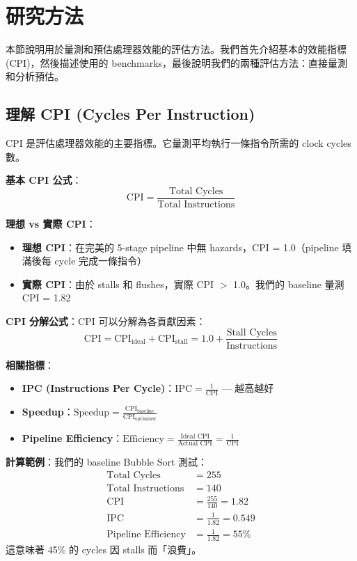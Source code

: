 \documentclass[journal]{IEEEtran}
\begin{document}
\section{研究方法}

本節說明用於量測和預估處理器效能的評估方法。我們首先介紹基本的效能指標 (CPI)，然後描述使用的 benchmarks，最後說明我們的兩種評估方法：直接量測和分析預估。

\subsection{理解 CPI (Cycles Per Instruction)}
CPI 是評估處理器效能的主要指標。它量測平均執行一條指令所需的 clock cycles 數。

\textbf{基本 CPI 公式}：
\begin{equation}
\text{CPI} = \frac{\text{Total Cycles}}{\text{Total Instructions}}
\label{eq:cpi}
\end{equation}

\textbf{理想 vs 實際 CPI}：
\begin{itemize}
    \item \textbf{理想 CPI}：在完美的 5-stage pipeline 中無 hazards，CPI = 1.0（pipeline 填滿後每 cycle 完成一條指令）
    \item \textbf{實際 CPI}：由於 stalls 和 flushes，實際 CPI $>$ 1.0。我們的 baseline 量測 CPI = 1.82
\end{itemize}

\textbf{CPI 分解公式}：CPI 可以分解為各貢獻因素：
\begin{equation}
\text{CPI} = \text{CPI}_{\text{ideal}} + \text{CPI}_{\text{stall}} = 1.0 + \frac{\text{Stall Cycles}}{\text{Instructions}}
\label{eq:cpibreak}
\end{equation}

\textbf{相關指標}：
\begin{itemize}
    \item \textbf{IPC (Instructions Per Cycle)}：$\text{IPC} = \frac{1}{\text{CPI}}$ --- 越高越好
    \item \textbf{Speedup}：$\text{Speedup} = \frac{\text{CPI}_{\text{baseline}}}{\text{CPI}_{\text{optimized}}}$
    \item \textbf{Pipeline Efficiency}：$\text{Efficiency} = \frac{\text{Ideal CPI}}{\text{Actual CPI}} = \frac{1}{\text{CPI}}$
\end{itemize}

\textbf{計算範例}：我們的 baseline Bubble Sort 測試：
\begin{align*}
\text{Total Cycles} &= 255 \\
\text{Total Instructions} &= 140 \\
\text{CPI} &= \frac{255}{140} = 1.82 \\
\text{IPC} &= \frac{1}{1.82} = 0.549 \\
\text{Pipeline Efficiency} &= \frac{1}{1.82} = 55\%
\end{align*}
這意味著 45\% 的 cycles 因 stalls 而「浪費」。
\end{document}

